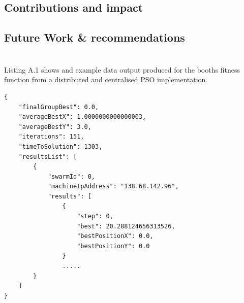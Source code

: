 \documentclass[oneside,12pt]{book}
\begin{document}
\section{Contributions and impact}
\section{Future Work \& recommendations}





\appendix
\chapter{}
Listing A.1 shows and example data output produced for the booths fitness function from a distributed and centralised PSO implementation. 
\begin{lstlisting}
{
	"finalGroupBest": 0.0,
	"averageBestX": 1.0000000000000003,
	"averageBestY": 3.0,
	"iterations": 151,
	"timeToSolution": 1303,
	"resultsList": [
		{
			"swarmId": 0,
			"machineIpAddress": "138.68.142.96",
			"results": [
				{
					"step": 0,
					"best": 20.288124656313526,
					"bestPositionX": 0.0,
					"bestPositionY": 0.0
				}
				.....
		}
	]
}
\end{lstlisting}
\end{document}
